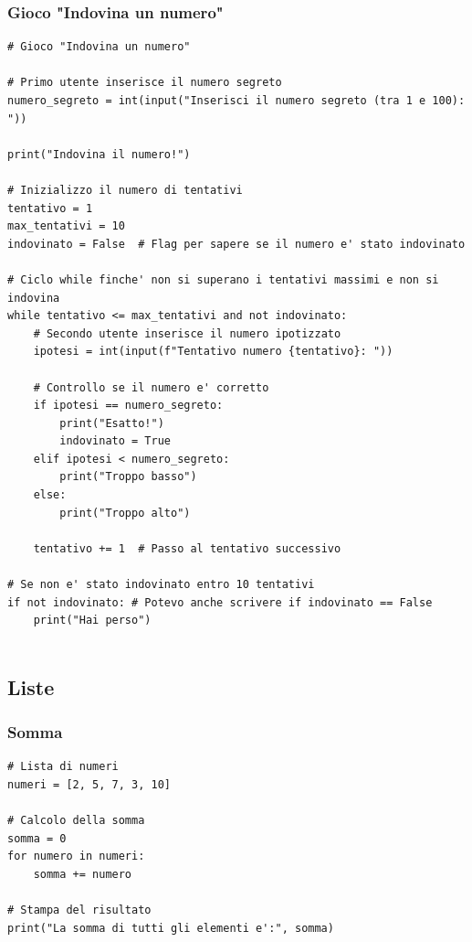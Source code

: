 \documentclass[a4paper,12pt]{article}
\begin{document}
\subsubsection{Gioco "Indovina un numero"}

\begin{lstlisting}
# Gioco "Indovina un numero"

# Primo utente inserisce il numero segreto
numero_segreto = int(input("Inserisci il numero segreto (tra 1 e 100): "))

print("Indovina il numero!")

# Inizializzo il numero di tentativi
tentativo = 1
max_tentativi = 10
indovinato = False  # Flag per sapere se il numero e' stato indovinato

# Ciclo while finche' non si superano i tentativi massimi e non si indovina
while tentativo <= max_tentativi and not indovinato:
	# Secondo utente inserisce il numero ipotizzato
	ipotesi = int(input(f"Tentativo numero {tentativo}: "))

	# Controllo se il numero e' corretto
	if ipotesi == numero_segreto:
		print("Esatto!")
		indovinato = True
	elif ipotesi < numero_segreto:
		print("Troppo basso")
	else:
		print("Troppo alto")

	tentativo += 1  # Passo al tentativo successivo

# Se non e' stato indovinato entro 10 tentativi
if not indovinato: # Potevo anche scrivere if indovinato == False
	print("Hai perso")


\end{lstlisting}

\newpage

\subsection{Liste}

\subsubsection{Somma}

\begin{lstlisting}
# Lista di numeri
numeri = [2, 5, 7, 3, 10]
	
# Calcolo della somma
somma = 0
for numero in numeri:
	somma += numero
	
# Stampa del risultato
print("La somma di tutti gli elementi e':", somma)
\end{lstlisting}
	
	
\newpage
\end{document}
